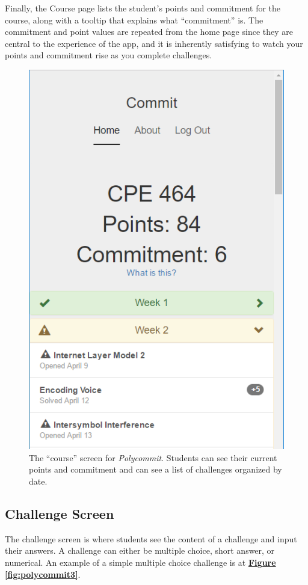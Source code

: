 \par Finally, the Course page lists the student's points and commitment for the course, along with a tooltip that explains what ``commitment'' is. The commitment and point values are repeated from the home page since they are central to the experience of the app, and it is inherently satisfying to watch your points and commitment rise as you complete challenges.

\begin{figure}
	\includegraphics{figures/polycommit-challenges}
	\caption{The ``course'' screen for \textit{Polycommit}. Students can see their current points and commitment and can see a list of challenges organized by date.}
	\label{fig:polycommit2}
\end{figure}

\subsection{Challenge Screen}
\par The challenge screen is where students see the content of a challenge and input their answers. A challenge can either be multiple choice, short answer, or numerical. An example of a simple multiple choice challenge is at \textbf{\hyperref[fig:polycommit3]{Figure \ref*{fig:polycommit3}}}.

